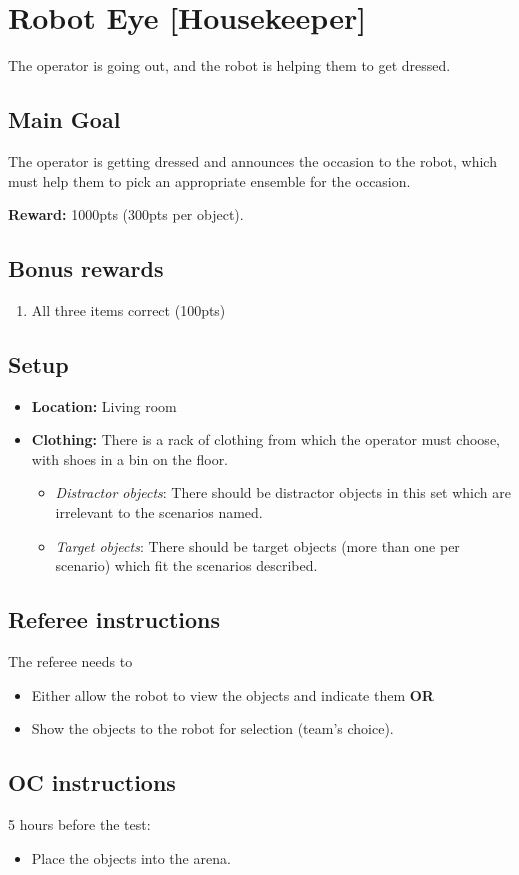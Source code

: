 \section{Robot Eye [Housekeeper]}
The operator is going out, and the robot is helping them to get dressed.


\subsection{Main Goal}
The operator is getting dressed and announces the occasion to the robot, which must help them to pick an appropriate ensemble for the occasion.

\noindent\textbf{Reward:} 1000pts (300pts per object).

\subsection{Bonus rewards}
\begin{enumerate}[nosep]
	\item All three items correct (100pts)
\end{enumerate}


\subsection{Setup}
\begin{itemize}[nosep]
	\item \textbf{Location:} Living room

	\item \textbf{Clothing:} There is a rack of clothing from which the operator must choose, with shoes in a bin on the floor.
	\begin{itemize}[nosep]
		\item\textit{Distractor objects}: There should be distractor objects in this set which are irrelevant to the scenarios named.
		\item\textit{Target objects}: There should be target objects (more than one per scenario) which fit the scenarios described.
	\end{itemize}
\end{itemize}

\subsection{Referee instructions}
The referee needs to
\begin{itemize}
	\item Either allow the robot to view the objects and indicate them \textbf{OR}
	\item Show the objects to the robot for selection (team's choice).
\end{itemize}

\subsection{OC instructions}
5 hours before the test:
\begin{itemize}
	\item Place the objects into the arena.
\end{itemize}
